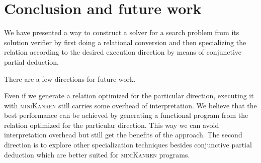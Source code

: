 \section{Conclusion and future work}

We have presented a way to construct a solver for a search problem from its solution verifier by first doing a relational conversion and then specializing the relation according to the desired execution direction by means of conjunctive partial deduction.

There are a few directions for future work. 

Even if we generate a relation optimized for the particular direction, executing it with \textsc{miniKanren} still carries some overhead of interpretation. We believe that the best performance can be achieved by generating a functional program from the relation optimized for the particular direction. 
This way we can avoid interpretation overhead but still get the benefits of the approach.  
The second direction is to explore other specialization techniques besides conjunctive partial deduction which are better suited for \textsc{miniKanren} programs.




